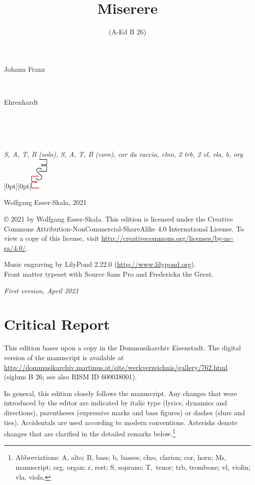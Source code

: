 \documentclass[parskip=full]{scrreprt}
\makeatletter
\DeclareRobustCommand{\sbseries}{\fontseries{sb}\selectfont}
\newcommand\fancytitlehead{
  \headingfont%
  \fontsize{80}{80}\selectfont%
  \textcolor{black!80}{%
    \makebox[0pt][l]{\@ifundefined{@shortname}{\@lastname}{\@shortname}.}%
  }\\[15pt]%
  \fontsize{60}{60}\selectfont%
  \makebox[0pt][l]{\@ifundefined{@shorttitle}{\@title}{\@shorttitle}.}%
}
\def\firstname#1{\def\@firstname{#1}}
\def\lastname#1{\def\@lastname{#1}}
\def\scoring#1{\def\@scoring{#1}}
\def\maketitle{%
\begin{titlepage}%
  \Large%
  {\@titlehead}%
  \vfill%
  {\strut\@firstname}\\%
  {\sbseries\color{oldred}\strut\@lastname}\\%
  {\strut\@namesuffix}%
  \vfill%
  {\sbseries\@title}\\%
  {\@subtitle}\\[\baselineskip]%
  {\itshape\@scoring}%
  \vfill%
  {\itshape\@parts}\hspace*{\fill}\raisebox{0pt}[0pt][0pt]{\includegraphics{ees_logo}}%
\end{titlepage}%
}
\newif\ifprintreport\printreportfalse
\makeatother
\begin{document}
\frenchspacing

\titlehead{\fancytitlehead}
\firstname{Johann Franz}
\lastname{Ehrenhardt}
\title{Miserere}
\subtitle{(A-Ed B 26)}
\scoring{S, A, T, B (solo), S, A, T, B (coro), cor da caccia, clno, 2 trb, 2 vl, vla, b, org}
\maketitle


\thispagestyle{empty}

\vspace*{\fill}

\hspace*{1em}Wolfgang Esser-Skala, 2021

© 2021 by Wolfgang Esser-Skala. This edition is licensed under the Creative Commons Attribution-NonCommercial-ShareAlike 4.0 International License. To view a copy of this license, visit \url{http://creativecommons.org/licenses/by-nc-sa/4.0/}.

Music engraving by LilyPond 2.22.0 (\url{http://www.lilypond.org}).\\
Front matter typeset with Source Sans Pro and Fredericka the Great.

\textit{First version, April 2021}

\vspace*{2cm}

\ifprintreport
\chapter*{Critical Report}

This edition bases upon a copy in the Dommusikarchiv Eisenstadt. The digital version of the manuscript is available at \url{http://dommusikarchiv.martinus.at/site/werkverzeichnis/gallery/762.html} (siglum B 26; see also RISM ID 600038001).

In general, this edition closely follows the manuscript. Any changes that were introduced by the editor are indicated by italic type (lyrics, dynamics and directions), parentheses (expressive marks and bass figures) or dashes (slurs and ties). Accidentals are used according to modern conventions. Asterisks denote changes that are clarified in the detailed remarks below.\footnote{Abbreviations: A, alto; B, bass; b, basses; clno, clarion; cor, horn; Ms, manuscript; org, organ; r, rest; S, soprano; T,~tenor; trb, trombone; vl, violin; vla, viola.}
\end{document}
